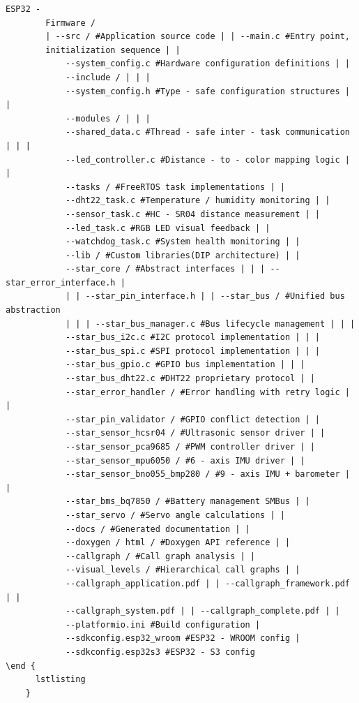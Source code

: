 \begin{lstlisting}[basicstyle =\tiny\ttfamily, frame = single,
                    caption = {ESP32 Firmware Repository Structure},
                    float = h] ESP32 -
        Firmware /
        | --src / #Application source code | | --main.c #Entry point,
        initialization sequence | |
            --system_config.c #Hardware configuration definitions | |
            --include / | | |
            --system_config.h #Type - safe configuration structures | |
            --modules / | | |
            --shared_data.c #Thread - safe inter - task communication | | |
            --led_controller.c #Distance - to - color mapping logic | |
            --tasks / #FreeRTOS task implementations | |
            --dht22_task.c #Temperature / humidity monitoring | |
            --sensor_task.c #HC - SR04 distance measurement | |
            --led_task.c #RGB LED visual feedback | |
            --watchdog_task.c #System health monitoring | |
            --lib / #Custom libraries(DIP architecture) | |
            --star_core / #Abstract interfaces | | | --star_error_interface.h |
            | | --star_pin_interface.h | | --star_bus / #Unified bus abstraction
            | | | --star_bus_manager.c #Bus lifecycle management | | |
            --star_bus_i2c.c #I2C protocol implementation | | |
            --star_bus_spi.c #SPI protocol implementation | | |
            --star_bus_gpio.c #GPIO bus implementation | | |
            --star_bus_dht22.c #DHT22 proprietary protocol | |
            --star_error_handler / #Error handling with retry logic | |
            --star_pin_validator / #GPIO conflict detection | |
            --star_sensor_hcsr04 / #Ultrasonic sensor driver | |
            --star_sensor_pca9685 / #PWM controller driver | |
            --star_sensor_mpu6050 / #6 - axis IMU driver | |
            --star_sensor_bno055_bmp280 / #9 - axis IMU + barometer | |
            --star_bms_bq7850 / #Battery management SMBus | |
            --star_servo / #Servo angle calculations | |
            --docs / #Generated documentation | |
            --doxygen / html / #Doxygen API reference | |
            --callgraph / #Call graph analysis | |
            --visual_levels / #Hierarchical call graphs | |
            --callgraph_application.pdf | | --callgraph_framework.pdf | |
            --callgraph_system.pdf | | --callgraph_complete.pdf | |
            --platformio.ini #Build configuration |
            --sdkconfig.esp32_wroom #ESP32 - WROOM config |
            --sdkconfig.esp32s3 #ESP32 - S3 config
\end {
      lstlisting
    }


\end{lstlisting}
